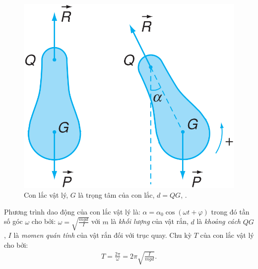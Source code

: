 \documentclass{article}
\numberwithin{equation}{section}
\begin{document}
\begin{figure}[H]
	\centering
	\includegraphics[scale=0.15]{con_lac_vat_ly}
	\caption{Con lắc vật lý, $G$ là trọng tâm của con lắc, $d = QG$, \cite[Hình 7.3, p. 39]{SGK_Vat_Ly_12_nang_cao}.}
	\label{fig:con_lac_vat_ly}
\end{figure}
Phương trình dao động của con lắc vật lý là: $\alpha = \alpha_0\cos(\omega t + \varphi)$ trong đó tần số góc $\omega$ cho bởi: $\omega = \sqrt{\frac{mgd}{I}}$ với $m$ là \textit{khối lượng} của vật rắn, $d$ là \textit{khoảng cách} $QG$, $I$ là \textit{momen quán tính} của vật rắn đối với trục quay. Chu kỳ $T$ của con lắc vật lý cho bởi:
\begin{align}
	\label{SGK_Vat_Ly_12_nang_cao (7.13)}
	T = \frac{2\pi}{\omega} = 2\pi\sqrt{\frac{I}{mgd}}.
\end{align}
\end{document}
